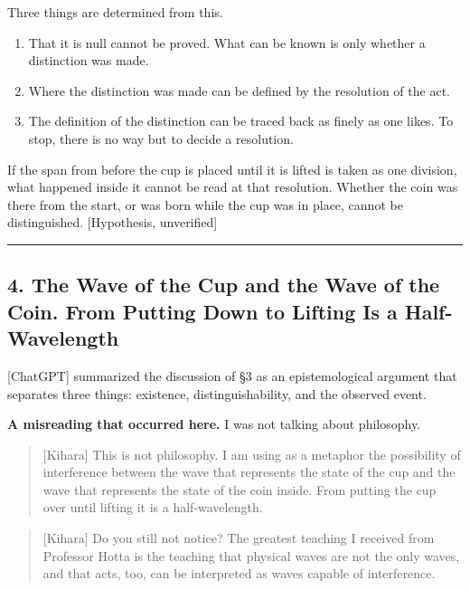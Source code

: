 \documentclass[
  a4paper,
]{article}
\providecommand{\tightlist}{%
  \setlength{\itemsep}{0pt}\setlength{\parskip}{0pt}}
\begin{document}
Three things are determined from this.

\begin{enumerate}
\def\labelenumi{\arabic{enumi}.}
\tightlist
\item
  That it is null cannot be proved. What can be known is only whether a
  distinction was made.
\item
  Where the distinction was made can be defined by the resolution of the
  act.
\item
  The definition of the distinction can be traced back as finely as one
  likes. To stop, there is no way but to decide a resolution.
\end{enumerate}

If the span from before the cup is placed until it is lifted is taken as
one division, what happened inside it cannot be read at that resolution.
Whether the coin was there from the start, or was born while the cup was
in place, cannot be distinguished. {[}Hypothesis, unverified{]}

\begin{center}\rule{0.5\linewidth}{0.5pt}\end{center}

\subsection{4. The Wave of the Cup and the Wave of the Coin. From
Putting Down to Lifting Is a
Half-Wavelength}\label{the-wave-of-the-cup-and-the-wave-of-the-coin.-from-putting-down-to-lifting-is-a-half-wavelength}

{[}ChatGPT{]} summarized the discussion of §3 as an epistemological
argument that separates three things: existence, distinguishability, and
the observed event.

\textbf{A misreading that occurred here.} I was not talking about
philosophy.

\begin{quote}
{[}Kihara{]} This is not philosophy. I am using as a metaphor the
possibility of interference between the wave that represents the state
of the cup and the wave that represents the state of the coin inside.
From putting the cup over until lifting it is a half-wavelength.
\end{quote}

\begin{quote}
{[}Kihara{]} Do you still not notice? The greatest teaching I received
from Professor Hotta is the teaching that physical waves are not the
only waves, and that acts, too, can be interpreted as waves capable of
interference.
\end{quote}
\end{document}
